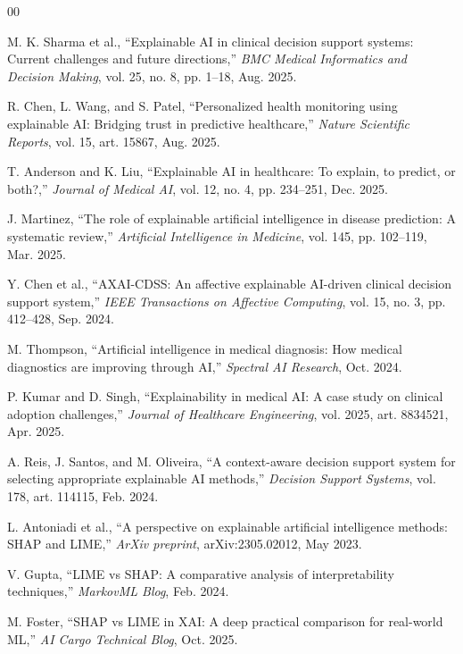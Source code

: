 \documentclass{ieeeaccess}
\begin{document}
\begin{thebibliography}{00}

 M. K. Sharma et al., ``Explainable AI in clinical decision support systems: Current challenges and future directions,'' \emph{BMC Medical Informatics and Decision Making}, vol. 25, no. 8, pp. 1--18, Aug. 2025.

 R. Chen, L. Wang, and S. Patel, ``Personalized health monitoring using explainable AI: Bridging trust in predictive healthcare,'' \emph{Nature Scientific Reports}, vol. 15, art. 15867, Aug. 2025.

 T. Anderson and K. Liu, ``Explainable AI in healthcare: To explain, to predict, or both?,'' \emph{Journal of Medical AI}, vol. 12, no. 4, pp. 234--251, Dec. 2025.

 J. Martinez, ``The role of explainable artificial intelligence in disease prediction: A systematic review,'' \emph{Artificial Intelligence in Medicine}, vol. 145, pp. 102--119, Mar. 2025.

 Y. Chen et al., ``AXAI-CDSS: An affective explainable AI-driven clinical decision support system,'' \emph{IEEE Transactions on Affective Computing}, vol. 15, no. 3, pp. 412--428, Sep. 2024.

 M. Thompson, ``Artificial intelligence in medical diagnosis: How medical diagnostics are improving through AI,'' \emph{Spectral AI Research}, Oct. 2024.

 P. Kumar and D. Singh, ``Explainability in medical AI: A case study on clinical adoption challenges,'' \emph{Journal of Healthcare Engineering}, vol. 2025, art. 8834521, Apr. 2025.

 A. Reis, J. Santos, and M. Oliveira, ``A context-aware decision support system for selecting appropriate explainable AI methods,'' \emph{Decision Support Systems}, vol. 178, art. 114115, Feb. 2024.

 L. Antoniadi et al., ``A perspective on explainable artificial intelligence methods: SHAP and LIME,'' \emph{ArXiv preprint}, arXiv:2305.02012, May 2023.

 V. Gupta, ``LIME vs SHAP: A comparative analysis of interpretability techniques,'' \emph{MarkovML Blog}, Feb. 2024.

 M. Foster, ``SHAP vs LIME in XAI: A deep practical comparison for real-world ML,'' \emph{AI Cargo Technical Blog}, Oct. 2025.


\end{thebibliography}
\end{document}
